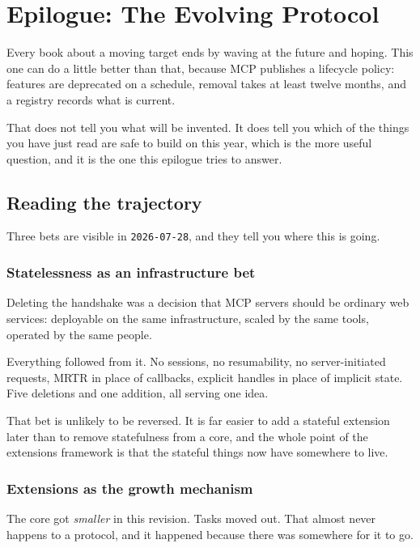 \chapter*{Epilogue: The Evolving Protocol}
\label{ch:epilogue}

Every book about a moving target ends by waving at the future and hoping. This
one can do a little better than that, because MCP publishes a lifecycle policy:
features are deprecated on a schedule, removal takes at least twelve months, and
a registry records what is current.

That does not tell you what will be invented. It does tell you which of the
things you have just read are safe to build on this year, which is the more
useful question, and it is the one this epilogue tries to answer.

\section{Reading the trajectory}

Three bets are visible in \texttt{2026-07-28}, and they tell you where this is
going.

\subsection{Statelessness as an infrastructure bet}

Deleting the handshake was a decision that MCP servers should be ordinary web
services: deployable on the same infrastructure, scaled by the same tools,
operated by the same people.

Everything followed from it. No sessions, no resumability, no server-initiated requests, MRTR in place of callbacks, explicit handles in
place of implicit state.
Five deletions and one addition, all serving one idea.

That bet is unlikely to be reversed. It is far easier to add a stateful extension
later than to remove statefulness from a core, and the whole point of the
extensions framework is that the stateful things now have somewhere to live.

\subsection{Extensions as the growth mechanism}

The core got \emph{smaller} in this revision. Tasks moved out. That almost never
happens to a protocol, and it happened because there was somewhere for it to go.

